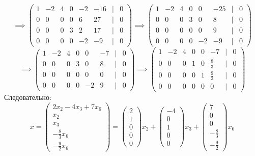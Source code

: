 \documentclass[a4paper]{article}
\newcommand{\mat}[1]{\begin{pmatrix} #1 \end{pmatrix}}
\renewcommand{\f}[2]{\frac{#1}{#2}}
\begin{document}
\begin{enumerate}
\begin{enumerate}
        $$
        \implies \begin{pmatrix}
            1 & -2 & 4 & 0 & -2 & -16 & | & 0 \\
            0 & 0 & 0 & 0 & 6 & 27 & | & 0 \\
            0 & 0 & 0 & 3 & 2 & 17 & | & 0 \\
            0 & 0 & 0 & 0 & -2 & -9 & | & 0
            \end{pmatrix}
        \implies  \begin{pmatrix}
            1 & -2 & 4 & 0 & 0 & -25 & | & 0 \\
            0 & 0 & 0 & 3 & 0 & 8 & | & 0 \\
            0 & 0 & 0 & 0 & 0 & 9 & | & 0 \\
            0 & 0 & 0 & 0 & -2 & -9 & | & 0
        \end{pmatrix}
        $$
        $$
        \implies \begin{pmatrix}
            1 & -2 & 4 & 0 & 0 & -7 & | & 0 \\
            0 & 0 & 0 & 3 & 0 & 8 & | & 0 \\
            0 & 0 & 0 & 0 & 0 & 0 & | & 0\\
            0 & 0 & 0 & 0 & -2 & 9 & | & 0 
        \end{pmatrix}
        \implies 
            \begin{pmatrix}
            1 & -2 & 4 & 0 & 0 & -7 &| & 0 \\
            0 & 0 & 0 & 1 & 0 & \frac{8}{3} &| & 0 \\
            0 & 0 & 0 & 0 & 1 & \frac{9}{2} & | &0 \\
            0 & 0 & 0 & 0 & 0 & 0 & | & 0
            \end{pmatrix}
        $$
        Следовательно:
        $$x= \mat{2x_2-4x_3+7x_6 \\ x_2 \\ x_3\\-\f{8}{3}x_6 \\ -\f{9}{2}x_6} = \mat{2 \\ 1 \\ 0\\0\\ 0}x_2+\mat{-4 \\ 0 \\ 1\\0 \\ 0}x_3+\mat{7 \\ 0\\ 0\\-\f{8}{3} \\ -\f{9}{2}}x_6$$

\end{enumerate}
\end{enumerate}
\end{document}
